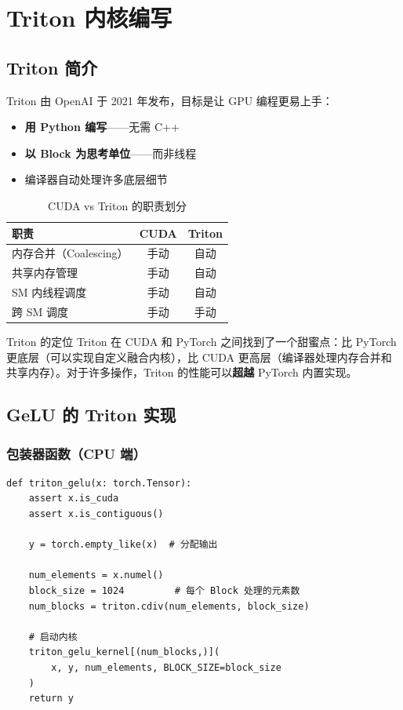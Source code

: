\section{Triton 内核编写}

\subsection{Triton 简介}

Triton 由 OpenAI 于 2021 年发布，目标是让 GPU 编程更易上手：

\begin{itemize}
    \item \textbf{用 Python 编写}——无需 C++
    \item \textbf{以 Block 为思考单位}——而非线程
    \item 编译器自动处理许多底层细节
\end{itemize}

\begin{table}[H]
\centering
\begin{tabular}{lcc}
\toprule
\textbf{职责} & \textbf{CUDA} & \textbf{Triton} \\
\midrule
内存合并（Coalescing） & 手动 & 自动 \\
共享内存管理 & 手动 & 自动 \\
SM 内线程调度 & 手动 & 自动 \\
跨 SM 调度 & 手动 & 手动 \\
\bottomrule
\end{tabular}
\caption{CUDA vs Triton 的职责划分}
\end{table}

\begin{importantbox}{Triton 的定位}
Triton 在 CUDA 和 PyTorch 之间找到了一个甜蜜点：比 PyTorch 更底层（可以实现自定义融合内核），比 CUDA 更高层（编译器处理内存合并和共享内存）。对于许多操作，Triton 的性能可以\textbf{超越} PyTorch 内置实现。
\end{importantbox}

\subsection{GeLU 的 Triton 实现}

\subsubsection{包装器函数（CPU 端）}

\begin{lstlisting}[caption={Triton GeLU 包装器}]
def triton_gelu(x: torch.Tensor):
    assert x.is_cuda
    assert x.is_contiguous()

    y = torch.empty_like(x)  # 分配输出

    num_elements = x.numel()
    block_size = 1024         # 每个 Block 处理的元素数
    num_blocks = triton.cdiv(num_elements, block_size)

    # 启动内核
    triton_gelu_kernel[(num_blocks,)](
        x, y, num_elements, BLOCK_SIZE=block_size
    )
    return y
\end{lstlisting}

